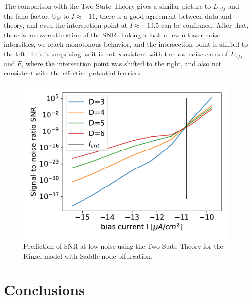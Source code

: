 \documentclass[12pt,a4paper]{article}
\begin{document}
The comparison with the Two-State Theory gives a similar picture to $D_{eff}$ and the fano factor. Up to $I\approx-11$, there is a good agreement between data and theory, and even the intersection point at $I\approx-10.5$ can be confirmed. After that, there is an overestimation of the SNR. Taking a look at even lower noise intensities, we reach monotonous behavior, and the intersection point is shifted to the left. This is surprising as it is not consistent with the low-noise cases of $D_{eff}$ and $F$, where the intersection point was shifted to the right, and also not consistent with the effective potential barriers. 
\begin{figure}[H]
	\centering
	\includegraphics[scale=1]{snrinzelpred.pdf}\caption{Prediction of SNR at low noise  using the Two-State Theory for the Rinzel model with Saddle-node bifurcation.}
	\label{snrinzelpred}
\end{figure}
\section{Conclusions}



\end{document}
